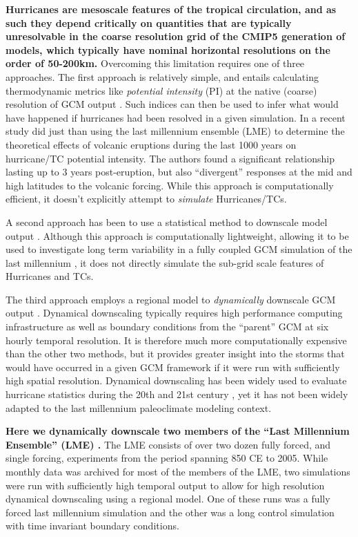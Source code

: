 \documentclass[smallextended]{svjour3}       %
\begin{document}
\textbf{Hurricanes are mesoscale features of the tropical circulation,
  and as such they depend critically on quantities that are typically
  unresolvable in the coarse resolution grid of the CMIP5 generation
  of models, which typically have nominal horizontal resolutions on
  the order of 50-200km.} Overcoming this limitation requires one of
three approaches. The first approach is relatively simple, and entails
calculating thermodynamic metrics like \textit{potential intensity}
(PI) at the native (coarse) resolution of GCM output
\cite{wang,ke_nolan,tang}. Such indices can then be used to infer what
would have happened if hurricanes had been resolved in a given
simulation.  In a recent study \cite{REF} %
did just than using the
last millennium ensemble (LME) to determine the theoretical effects of
volcanic eruptions during the last 1000 years on hurricane/TC
potential intensity. The authors found a significant relationship
lasting up to 3 years post-eruption, but also ``divergent'' responses
at the mid and high latitudes to the volcanic forcing. While this
approach is computationally efficient, it doesn't explicitly attempt
to \textit{simulate} Hurricanes/TCs.

A second approach has been to use a statistical method to downscale
model output \cite{down_method_ke,cam_down_ke}. Although this approach
is computationally lightweight, allowing it to be used to investigate
long term variability in a fully coupled GCM simulation of the last
millennium \cite{lme_down_ke}, it does not directly simulate the
sub-grid scale features of Hurricanes and TCs.

The third approach employs a regional model to \textit{dynamically}
downscale GCM output \cite{down_21st_gv}. Dynamical
downscaling typically requires high performance computing
infrastructure as well as boundary conditions from the ``parent'' GCM
at six hourly temporal resolution. It is therefore much more
computationally expensive than the other two methods, but it provides
greater insight into the storms that would have occurred in a given
GCM framework if it were run with sufficiently high spatial
resolution. Dynamical downscaling has been widely used to evaluate
hurricane statistics during the 20th and 21st century \cite{REF}, yet
it has not been widely adapted to the last millennium paleoclimate
modeling context.

\textbf{Here we dynamically downscale two members of the ``Last
  Millennium Ensemble'' (LME) \cite{gcm_lme}.} The LME consists of
over two dozen fully forced, and single forcing, experiments from the
period spanning 850 CE to 2005. While monthly data was archived for
most of the members of the LME, two simulations were run with
sufficiently high temporal output to allow for high resolution
dynamical downscaling using a regional model. One of these runs was a
fully forced last millennium simulation and the other was a long
control simulation with time invariant boundary
conditions.
\end{document}
